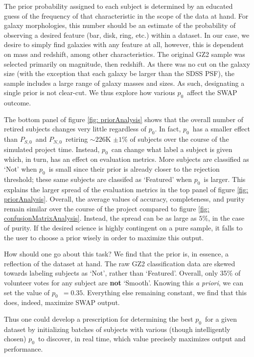 \documentclass[twocolumn]{aastex6}
\newcommand{\Ps}{$P_{S,0}$}
\newcommand{\Pn}{$P_{N,0}$}
\newcommand{\p}{$p_0$}
\begin{document}
The prior probability assigned to each subject is determined by an educated guess of 
the frequency of that characteristic in the scope of the data at hand. 
For galaxy morphologies, this number should be an estimate of the probability
of observing a desired feature (bar, disk, ring, etc.) within a dataset. In our case, 
we desire to simply find galaxies with any feature at all, however, this is dependent 
on mass and redshift, among other characteristics. The original GZ2 sample was selected
primarily on magnitude, then redshift.  As there was no cut on the galaxy size
(with the exception that each galaxy be larger than the SDSS PSF), the sample
includes a large range of galaxy masses and sizes. As such, designating a single 
prior is not clear-cut. We thus explore how various \p~affect the SWAP outcome.

The bottom panel of figure \ref{fig: priorAnalysis} shows that the overall number
of retired subjects changes very little regardless of \p. In fact, \p~has a smaller effect 
than \Ps~and \Pn~retiring $\sim226$K $\pm1\%$ of subjects over the course of the 
simulated project time. Instead, \p~can change what label a subject is given which, 
in turn, has an effect on evaluation metrics. More subjects are classified as `Not' 
when \p~is small since their prior is already closer to the rejection threshold; 
these same subjects are classifed as `Featured' when \p~is larger.
This explains the larger spread of the evaluation metrics in the top panel of figure 
\ref{fig: priorAnalysis}.  Overall, the average values of accuracy, completeness, 
and purity remain similar over the course of the project compared to figure 
\ref{fig: confusionMatrixAnalysis}. Instead, the spread can 
be as large as $5\%$, in the case of purity. If the desired science is highly contingent
on a pure sample, it falls to the user to choose a prior wisely in order to maximize 
this output. 

How should one go about this task? We find that the prior is, in essence, a reflection
of the dataset at hand. The raw GZ2 classification data are skewed towards labeling 
subjects as `Not', rather than `Featured'. Overall, only 35\% of volunteer votes for 
any subject are \textbf{not} `Smooth'. Knowing this \textit{a priori}, we can set the 
value of \p~$= 0.35$. Everything else remaining constant, we find that this does, 
indeed, maximize SWAP output. 

Thus one could develop a prescription for determining the best \p~for a given dataset
by initializing batches of subjects with various (though intelligently chosen) \p~to 
discover, in real time, which value precisely maximizes output and performance. 
\end{document}
